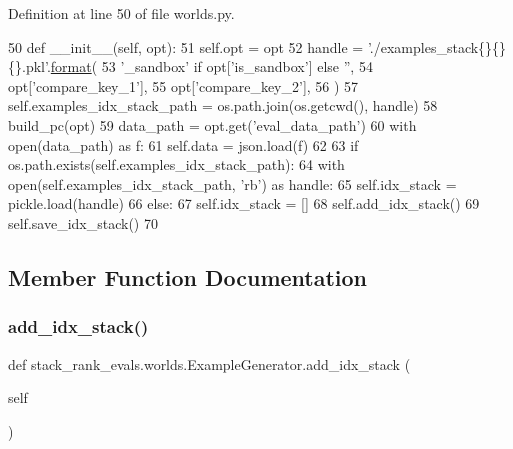 Definition at line 50 of file worlds.\+py.


\begin{DoxyCode}
50     \textcolor{keyword}{def }\_\_init\_\_(self, opt):
51         self.opt = opt
52         handle = \textcolor{stringliteral}{'./examples\_stack\{\}\{\}\{\}.pkl'}.\hyperlink{namespaceparlai_1_1chat__service_1_1services_1_1messenger_1_1shared__utils_a32e2e2022b824fbaf80c747160b52a76}{format}(
53             \textcolor{stringliteral}{'\_sandbox'} \textcolor{keywordflow}{if} opt[\textcolor{stringliteral}{'is\_sandbox'}] \textcolor{keywordflow}{else} \textcolor{stringliteral}{''},
54             opt[\textcolor{stringliteral}{'compare\_key\_1'}],
55             opt[\textcolor{stringliteral}{'compare\_key\_2'}],
56         )
57         self.examples\_idx\_stack\_path = os.path.join(os.getcwd(), handle)
58         build\_pc(opt)
59         data\_path = opt.get(\textcolor{stringliteral}{'eval\_data\_path'})
60         with open(data\_path) \textcolor{keyword}{as} f:
61             self.data = json.load(f)
62 
63         \textcolor{keywordflow}{if} os.path.exists(self.examples\_idx\_stack\_path):
64             with open(self.examples\_idx\_stack\_path, \textcolor{stringliteral}{'rb'}) \textcolor{keyword}{as} handle:
65                 self.idx\_stack = pickle.load(handle)
66         \textcolor{keywordflow}{else}:
67             self.idx\_stack = []
68             self.add\_idx\_stack()
69             self.save\_idx\_stack()
70 
\end{DoxyCode}


\subsection{Member Function Documentation}
\mbox{\label{classstack__rank__evals_1_1worlds_1_1ExampleGenerator_a9bc7f39d14003d695ad66b624607dc05}} 
\subsubsection{\texorpdfstring{add\+\_\+idx\+\_\+stack()}{add\_idx\_stack()}\hspace{0.1cm}{\footnotesize\ttfamily [1/2]}}
{\footnotesize\ttfamily def stack\+\_\+rank\+\_\+evals.\+worlds.\+Example\+Generator.\+add\+\_\+idx\+\_\+stack (\begin{DoxyParamCaption}\item[{}]{self }\end{DoxyParamCaption})}



